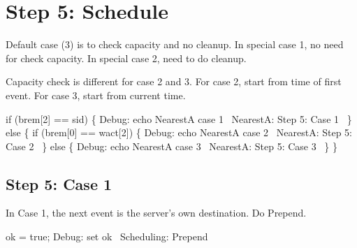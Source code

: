\section{Step 5: Schedule}

Default case (3) is to check capacity and no cleanup. In special case 1,
no need for check capacity. In special case 2, need to do cleanup.

Capacity check is different for case 2 and 3. For case 2, start from time of
first event. For case 3, start from current time.

\nwenddocs{}\endmoddef\nwstartdeflinemarkup{}\nwenddeflinemarkup
if (brem[2] == sid) \{
  \LA{}Debug: echo NearestA case 1~{\nwtagstyle{}}\RA{}
  \LA{}NearestA: Step 5: Case 1~{\nwtagstyle{}}\RA{}
\} else \{
  if (brem[0] == wact[2]) \{
    \LA{}Debug: echo NearestA case 2~{\nwtagstyle{}}\RA{}
    \LA{}NearestA: Step 5: Case 2~{\nwtagstyle{}}\RA{}
  \} else \{
    \LA{}Debug: echo NearestA case 3~{\nwtagstyle{}}\RA{}
    \LA{}NearestA: Step 5: Case 3~{\nwtagstyle{}}\RA{}
  \}
\}
\nwendcode{}\nwdocspar

\subsection{Step 5: Case 1}

In Case 1, the next event is the server's own destination. Do Prepend.

\nwenddocs{}\endmoddef\nwstartdeflinemarkup{}\nwenddeflinemarkup
ok = true;
\LA{}Debug: set ok~{\nwtagstyle{}}\RA{}
\LA{}Scheduling: Prepend~{\nwtagstyle{}}\RA{}
\nwendcode{}\nwdocspar

